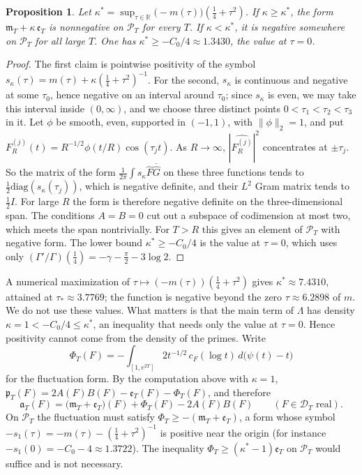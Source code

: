 \documentclass[11pt]{amsart}
\newtheorem{proposition}[theorem]{Proposition}
\theoremstyle{definition}
\theoremstyle{remark}
\numberwithin{equation}{section}
\newcommand{\R}{\mathbb{R}}
\newcommand{\cF}{c_F}                                  %
\newcommand{\PT}{\mathcal{P}_T}                        %
\newcommand{\DT}{\mathcal{D}_T}                        %
\newcommand{\mT}{\mathfrak{m}_T}                       %
\newcommand{\pT}{\mathfrak{p}_T}                       %
\newcommand{\aT}{\mathfrak{a}_T}                       %
\begin{document}
\begin{proposition}\label{w8:prop:kappa}
Let $\kappa^*=\sup_{\tau\in\R}\bigl(-m(\tau)\bigr)(\tfrac14+\tau^2)$. If $\kappa\ge\kappa^*$, the form
$\mT+\kappa\,\mathfrak e_T$ is nonnegative on $\PT$ for every $T$. If $\kappa<\kappa^*$, it is negative somewhere on
$\PT$ for all large $T$. One has $\kappa^*\ge-C_0/4\approx1.3430$, the value at $\tau=0$.
\end{proposition}

\begin{proof}
The first claim is pointwise positivity of the symbol
$s_\kappa(\tau)=m(\tau)+\kappa(\frac14+\tau^2)^{-1}$. For the second, $s_\kappa$ is continuous and negative at some
$\tau_0$, hence negative on an interval around $\tau_0$; since $s_\kappa$ is even, we may take this interval inside
$(0,\infty)$, and we choose three distinct points $0<\tau_1<\tau_2<\tau_3$ in it. Let
$\phi$ be smooth, even, supported in $(-1,1)$, with $\|\phi\|_2=1$, and put
$F^{(j)}_R(t)=R^{-1/2}\phi(t/R)\cos(\tau_jt)$. As $R\to\infty$, $|\widehat{F^{(j)}_R}|^2$ concentrates at $\pm\tau_j$.
So the matrix of the form $\frac1{2\pi}\int s_\kappa\widehat F\overline{\widehat G}$ on these three functions tends to
$\frac12\mathrm{diag}(s_\kappa(\tau_j))$, which is negative definite, and their $L^2$ Gram matrix tends to
$\frac12 I$. For large $R$ the form is therefore negative definite on the three-dimensional span. The conditions
$A=B=0$ cut out a subspace of codimension at most two, which meets the span nontrivially. For $T>R$ this gives an
element of $\PT$ with negative form.
The lower bound $\kappa^*\ge-C_0/4$ is the value at $\tau=0$, which uses only
$(\Gamma'/\Gamma)(\frac14)=-\gamma-\frac\pi2-3\log2$.
\end{proof}

A numerical maximization of $\tau\mapsto(-m(\tau))(\frac14+\tau^2)$ gives $\kappa^*\approx7.4310$, attained at
$\tau_*\approx3.7769$; the function is negative beyond the zero $\tau\approx6.2898$ of $m$. We do not use these
values. What matters is that the main term of $\Lambda$ has density $\kappa=1<-C_0/4\le\kappa^*$, an inequality
that needs only the value at $\tau=0$. Hence positivity cannot come from the density of the primes.
Write
\begin{equation}\label{w8:eq:Phi}
\Phi_T(F)=-\int_{[1,e^{2T}]}2t^{-1/2}\,\cF(\log t)\,d\bigl(\psi(t)-t\bigr)
\end{equation}
for the fluctuation form. By the computation above with $\kappa=1$, $\pT(F)=2A(F)B(F)-\mathfrak e_T(F)-\Phi_T(F)$,
and therefore
\begin{equation}\label{w8:eq:aTsplit}
\aT(F)=\bigl(\mT+\mathfrak e_T\bigr)(F)+\Phi_T(F)-2A(F)B(F)\qquad(F\in\DT\text{ real}).
\end{equation}
On $\PT$ the fluctuation must satisfy $\Phi_T\ge-(\mT+\mathfrak e_T)$, a form whose symbol
$-s_1(\tau)=-m(\tau)-(\frac14+\tau^2)^{-1}$ is positive near the origin (for instance $-s_1(0)=-C_0-4\approx1.3722$).
The inequality $\Phi_T\ge(\kappa^*-1)\mathfrak e_T$ on $\PT$ would suffice and is not necessary.
\end{document}
